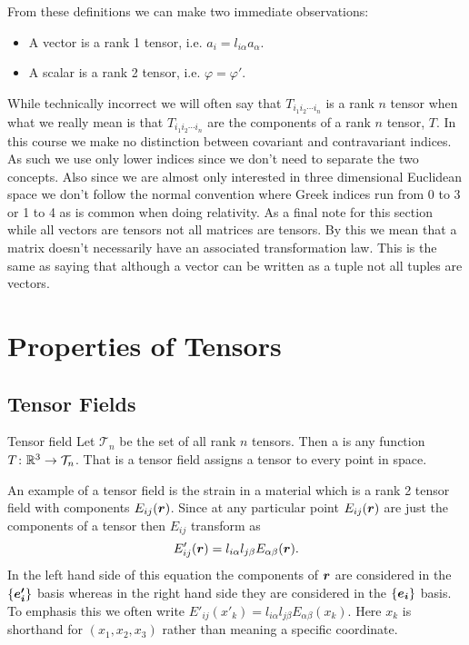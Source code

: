 \documentclass[a4paper]{article}
\begin{document}
    From these definitions we can make two immediate observations:
    \begin{itemize}
        \item A vector is a rank 1 tensor, i.e. \(a_i = l_{i\alpha}a_{\alpha}\).
        \item A scalar is a rank 2 tensor, i.e. \(\varphi = \varphi'\).
    \end{itemize}
    
    While technically incorrect we will often say that \(T_{i_1i_2\dotsm i_n}\) is a rank \(n\) tensor when what we really mean is that \(T_{i_1i_2\dotsm i_n}\) are the components of a rank \(n\) tensor, \(T\).
    In this course we make no distinction between covariant and contravariant indices.
    As such we use only lower indices since we don't need to separate the two concepts.
    Also since we are almost only interested in three dimensional Euclidean space we don't follow the normal convention where Greek indices run from 0 to 3 or 1 to 4 as is common when doing relativity.
    As a final note for this section while all vectors are tensors not all matrices are tensors.
    By this we mean that a matrix doesn't necessarily have an associated transformation law.
    This is the same as saying that although a vector can be written as a tuple not all tuples are vectors.
    
    \section{Properties of Tensors}
    \subsection{Tensor Fields}
    \begin{definition}{Tensor field}{}
        Let \(\mathcal{T}_n\) be the set of all rank \(n\) tensors.
        Then a  is any function \(T\colon\mathbb{R}^3 \to \mathcal{T}_n\).
        That is a tensor field assigns a tensor to every point in space.
    \end{definition}
    An example of a tensor field is the strain in a material which is a rank 2 tensor field with components \(E_{ij}(\bm{r})\).
    Since at any particular point \(E_{ij}(\bm{r})\) are just the components of a tensor then \(E_{ij}\) transform as
    \[E'_{ij}(\bm{r}) = l_{i\alpha}l_{j\beta}E_{\alpha\beta}(\bm{r}).\]
    In the left hand side of this equation the components of \(\bm{r}\) are considered in the \(\{\bm{e'_i}\}\) basis whereas in the right hand side they are considered in the \(\{\bm{e_{i}}\}\) basis.
    To emphasis this we often write \(E'_{ij}(x'_k) = l_{i\alpha}l_{j\beta}E_{\alpha\beta}(x_k)\).
    Here \(x_k\) is shorthand for \((x_1, x_2, x_3)\) rather than meaning a specific coordinate.
    
\end{document}
